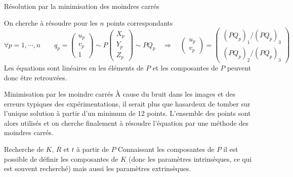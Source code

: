 \documentclass[8pt]{beamer}
\begin{document}
	\begin{frame}{Résolution par la minimisation des moindres carrés}
		\begin{block}{On cherche à résoudre pour les $n$ points correspondants}
			$$\forall p = 1, \cdots, n \qquad
			q_p = \begin{pmatrix}
			u_p\\v_p\\1
			\end{pmatrix} \sim P \begin{pmatrix}
			X_p\\Y_p\\Z_p
			\end{pmatrix} \sim PQ_p \quad \Rightarrow \quad
			\begin{pmatrix}
			u_p\\v_p
			\end{pmatrix} = \begin{pmatrix}
			(PQ_p)_1 / (PQ_p)_3\\(PQ_p)_2 / (PQ_p)_3
			\end{pmatrix}
			$$
			Les équations sont linéaires en les éléments de $P$ et les composantes de $P$ peuvent donc être retrouvées.
		\end{block}
		\begin{block}{Minimisation par les moindre carrés}
			\`A cause du bruit dans les images et des erreurs typiques des expérimentations, il serait plus que hasardeux de tomber sur l'unique solution à partir d'un minimum de 12 points. L'ensemble des points sont alors utilisés et on cherche finalement à résoudre l'équation par une méthode des moindres carrés.
		\end{block}
		\begin{block}{Recherche de $K$, $R$ et $t$ à partir de $P$}
			Connaissant les composantes de $P$ il est possible de définir les composantes de $K$ (donc les paramètres intrinsèques, ce qui est souvent recherché) mais aussi les paramètres extrinsèques. 
		\end{block}
	\end{frame}
\end{document}
